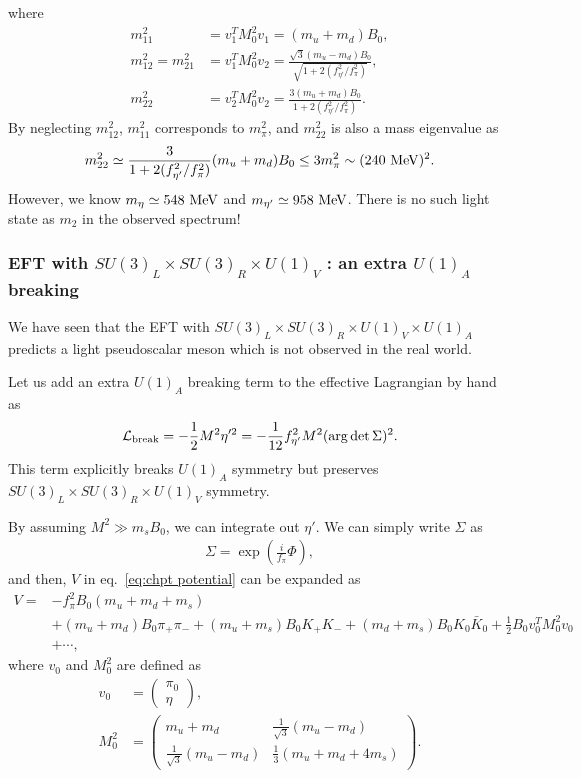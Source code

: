 \documentclass[11pt,a4paper]{article}
\begin{document}
where
\begin{align}
    m_{11}^2 &= v_1^T M_0^2 v_1 = (m_u + m_d)B_0, \\
    m_{12}^2 = m_{21}^2 &= v_1^T M_0^2 v_2 = \frac{\sqrt{3}(m_u-m_d)B_0}{\sqrt{1 + 2(f_{\eta'}^2/f_\pi^2)}}, \\
    m_{22}^2 &= v_2^T M_0^2 v_2 = \frac{3(m_u+m_d)B_0}{1+2(f_{\eta'}^2/f_\pi^2)}.
\end{align}
By neglecting $m_{12}^2$, $m_{11}^2$ corresponds to $m_\pi^2$, and $m_{22}^2$ is also a mass eigenvalue as
\begin{align}
    m_{22}^2 \simeq \frac{3}{1 + 2(f_{\eta'}^2/f_\pi^2)} (m_u+m_d)B_0 \leq 3 m_\pi^2 \sim (240~{\rm MeV})^2.
\end{align}
However, we know $m_\eta \simeq 548~{\rm MeV}$ and $m_{\eta'} \simeq 958~{\rm MeV}$. There is no such light state as $m_2$ in the observed spectrum!


\subsubsection{EFT with $SU(3)_L \times SU(3)_R \times U(1)_V$ : an extra $U(1)_A$ breaking}
We have seen that the EFT with $SU(3)_L \times SU(3)_R \times U(1)_V \times U(1)_A$ predicts a light pseudoscalar meson which is not observed in the real world.

Let us add an extra $U(1)_A$ breaking term to the effective Lagrangian by hand as
\begin{align}
    {\cal L}_{\rm break} = -\frac{1}{2} M^2 \eta'^2 = -\frac{1}{12} f_{\eta'}^2 M^2 ({\rm arg}\det \Sigma)^2.
\end{align}
This term explicitly breaks $U(1)_A$ symmetry but preserves $SU(3)_L \times SU(3)_R \times U(1)_V$ symmetry. 

By assuming $M^2 \gg m_s B_0$, we can integrate out $\eta'$. We can simply write $\Sigma$ as
\begin{align}
    \Sigma = \exp\left( \frac{i}{f_\pi} \Phi \right),
\end{align}
and then, $V$ in eq.~\eqref{eq:chpt potential} can be expanded as
\begin{align}
    V =& -f_\pi^2 B_0 (m_u+m_d+m_s) \nonumber\\
    & + (m_u+m_d)B_0 \pi_+ \pi_- + (m_u+m_s)B_0 K_+ K_- + (m_d+m_s)B_0 K_0 \bar K_0 + \frac{1}{2} B_0 v_0^T M_0^2 v_0 \nonumber\\
    & + \cdots,
\end{align}
where $v_0$ and $M_0^2$ are defined as
\begin{align}
    v_0 &= \left(\begin{array}{c} \pi_0 \\ \eta \end{array}\right), \\
    M_0^2 &= \left(\begin{array}{cc}
        m_u + m_d & \frac{1}{\sqrt 3}(m_u-m_d) \\
        \frac{1}{\sqrt 3}(m_u-m_d) & \frac{1}{3}(m_u+m_d+4m_s)
    \end{array}\right).
\end{align}
\end{document}
